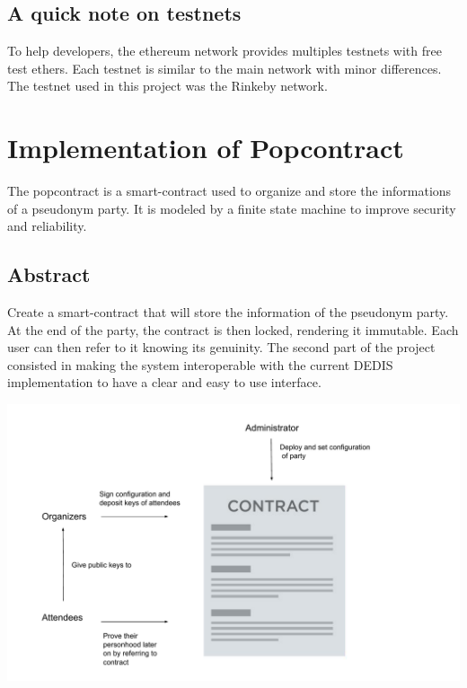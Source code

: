\documentclass[11pt, a4paper, twoside, openright]{book} %
\begin{document}
\subsection{A quick note on testnets}
To help developers, the ethereum network provides multiples testnets with free test ethers. Each testnet is similar to the main network with minor differences. The testnet used in this project was the Rinkeby network.


\newpage



\section{Implementation of Popcontract}
The popcontract is a smart-contract used to organize and store the informations of a pseudonym party. It is modeled by a finite state machine to improve security and reliability.
\subsection{Abstract}
Create a smart-contract that will store the information of the pseudonym party. At the end of the party, the contract is then locked, rendering it immutable. Each user can then refer to it knowing its genuinity.
The second part of the project consisted in making the system interoperable with the current DEDIS implementation to have a clear and easy to use interface.   


  
\begin{minipage}{1\linewidth}
    \includegraphics[scale = 0.67]{popcontract.pdf}
\end{minipage}%
  
\end{document}
